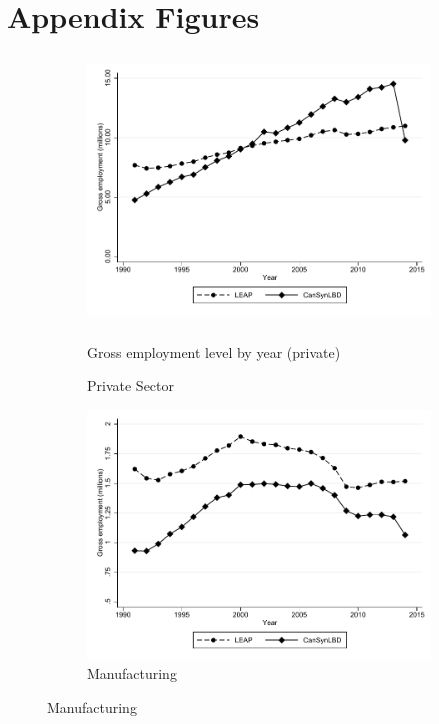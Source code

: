 
\section{Appendix Figures}
\label{sec:appendix_figures}

 
\begin{figure} [H]
\centering
\begin{subfigure}[h]{0.48\linewidth}
\label{tab:Can:GrossEmploymentPrivate}
\includegraphics[height=2.8in, width=.7\linewidth]{graphs/Gross_employment_level_by_year_private_bw.pdf} 
\caption{Gross employment level by year (private)} %
\caption{Private Sector}
\end{subfigure}
\hfill
\begin{subfigure}[h]{0.48\linewidth}
\includegraphics[width=\linewidth]{graphs/Gross_employment_level_by_year_manufacturing_bw.pdf}
\caption{Manufacturing}
\end{subfigure}%
\end{figure}



